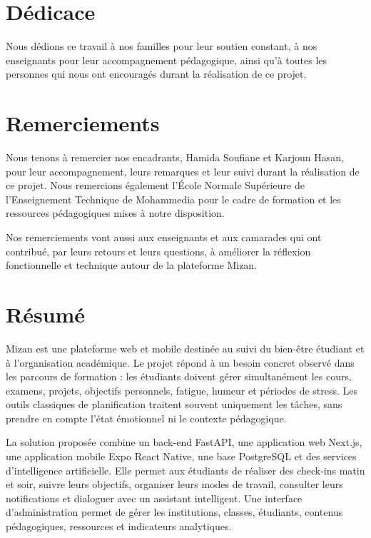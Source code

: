 \documentclass{rapportENSET}
\begin{document}
\fairemarges
\fairepagedegarde
{}


\section*{Dédicace}
Nous dédions ce travail à nos familles pour leur soutien constant, à nos enseignants pour leur accompagnement pédagogique, ainsi qu'à toutes les personnes qui nous ont encouragés durant la réalisation de ce projet.

\newpage

\section*{Remerciements}
Nous tenons à remercier nos encadrants, Hamida Soufiane et Karjoun Hasan, pour leur accompagnement, leurs remarques et leur suivi durant la réalisation de ce projet. Nous remercions également l'École Normale Supérieure de l'Enseignement Technique de Mohammedia pour le cadre de formation et les ressources pédagogiques mises à notre disposition.

Nos remerciements vont aussi aux enseignants et aux camarades qui ont contribué, par leurs retours et leurs questions, à améliorer la réflexion fonctionnelle et technique autour de la plateforme Mizan.

\newpage

\section*{Résumé}
Mizan est une plateforme web et mobile destinée au suivi du bien-être étudiant et à l'organisation académique. Le projet répond à un besoin concret observé dans les parcours de formation : les étudiants doivent gérer simultanément les cours, examens, projets, objectifs personnels, fatigue, humeur et périodes de stress. Les outils classiques de planification traitent souvent uniquement les tâches, sans prendre en compte l'état émotionnel ni le contexte pédagogique.

La solution proposée combine un back-end FastAPI, une application web Next.js, une application mobile Expo React Native, une base PostgreSQL et des services d'intelligence artificielle. Elle permet aux étudiants de réaliser des check-ins matin et soir, suivre leurs objectifs, organiser leurs modes de travail, consulter leurs notifications et dialoguer avec un assistant intelligent. Une interface d'administration permet de gérer les institutions, classes, étudiants, contenus pédagogiques, ressources et indicateurs analytiques.
\end{document}
